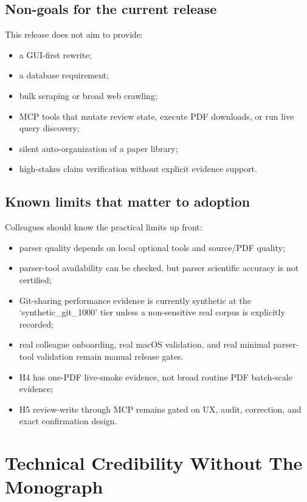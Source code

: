 \documentclass[11pt,a4paper,openany]{book}
\begin{document}
\section{Non-goals for the current release}

This release does not aim to provide:
\begin{itemize}[nosep]
  \item a GUI-first rewrite;
  \item a database requirement;
  \item bulk scraping or broad web crawling;
  \item MCP tools that mutate review state, execute PDF downloads, or run live
        query discovery;
  \item silent auto-organization of a paper library;
  \item high-stakes claim verification without explicit evidence support.
\end{itemize}

\section{Known limits that matter to adoption}

Colleagues should know the practical limits up front:
\begin{itemize}[nosep]
  \item parser quality depends on local optional tools and source/PDF quality;
  \item parser-tool availability can be checked, but parser scientific accuracy
        is not certified;
  \item Git-sharing performance evidence is currently synthetic at the
        `synthetic\_git\_1000' tier unless a non-sensitive real corpus is
        explicitly recorded;
  \item real colleague onboarding, real macOS validation, and real minimal
        parser-tool validation remain manual release gates.
  \item H4 has one-PDF live-smoke evidence, not broad routine PDF batch-scale
        evidence;
  \item H5 review-write through MCP remains gated on UX, audit, correction, and
        exact confirmation design.
\end{itemize}

\chapter{Technical Credibility Without The Monograph}
\end{document}
